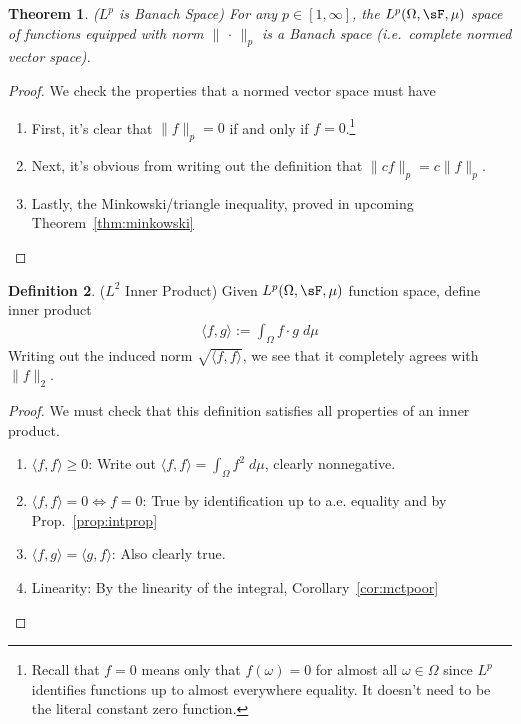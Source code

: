 \documentclass[12pt]{article}
\theoremstyle{plain}
\newtheorem{thm}{Theorem}[section]
\theoremstyle{definition}
\newtheorem{defn}[thm]{Definition}
\theoremstyle{remark}
\begin{document}
\begin{thm}\emph{($L^p$ is Banach Space)}
For any $p\in[1,\infty]$, the $L^p(\Omega,\sF,\mu)$ space of functions
equipped with norm $\lVert\,\cdot\,\rVert_p$ is a Banach space (i.e.\
complete normed vector space).
\end{thm}
\begin{proof}
We check the properties that a normed vector space must have
\begin{enumerate}
  \item First, it's clear that $\lVert f\rVert_p=0$ if and only if
    $f=0$.\footnote{%
      Recall that $f=0$ means only that $f(\omega)=0$ for almost all
      $\omega\in\Omega$ since $L^p$ identifies functions up to almost
      everywhere equality. It doesn't need to be the literal constant
      zero function.
    }
  \item Next, it's obvious from writing out the definition that $\lVert
    cf\rVert_p = c\lVert f\rVert_p$.
  \item Lastly, the Minkowski/triangle inequality,
    proved in upcoming Theorem~\ref{thm:minkowski}
\end{enumerate}
\end{proof}

\begin{defn}($L^2$ Inner Product)
\label{defn:L2}
Given $L^p(\Omega,\sF,\mu)$ function space, define inner product
\begin{align*}
  \langle f,g \rangle
  := \int_\Omega f\cdot g \; d\mu
\end{align*}
Writing out the induced norm $\sqrt{\langle f,f\rangle}$, we see that it
completely agrees with $\lVert f\rVert_2$.
\end{defn}
\begin{proof}
We must check that this definition satisfies all properties of an inner
product.
\begin{enumerate}[label=(\roman*)]
  \item $\langle f,f \rangle\geq 0$:
    Write out $\langle f,f\rangle = \int_\Omega f^2\;d\mu$,
    clearly nonnegative.
  \item $\langle f,f \rangle= 0 \iff f=0$:
    True by identification up to a.e.  equality and by
    Prop.~\ref{prop:intprop}
  \item $\langle f,g \rangle =\langle g,f \rangle$:
    Also clearly true.
  \item Linearity: By the linearity of the integral,
    Corollary~\ref{cor:mctpoor}
\end{enumerate}
\end{proof}
\end{document}
